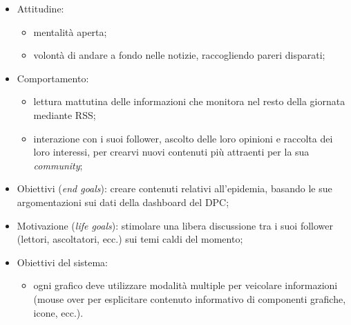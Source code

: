 \begin{itemize}
    \item Attitudine:
    \begin{itemize}
        \item mentalità aperta;
        \item volontà di andare a fondo nelle notizie, raccogliendo pareri disparati;
    \end{itemize}
    \item Comportamento: 
    \begin{itemize}
        \item lettura mattutina delle informazioni che monitora nel resto della giornata mediante RSS;
        \item interazione con i suoi follower, ascolto delle loro opinioni e raccolta dei loro interessi, per crearvi nuovi contenuti più attraenti per la sua \textit{community};
    \end{itemize}
    \item Obiettivi (\textit{end goals}): creare contenuti relativi all'epidemia, basando le sue argomentazioni sui dati della dashboard del DPC;
    \item Motivazione (\textit{life goals}): stimolare una libera discussione tra i suoi follower (lettori, ascoltatori, ecc.) sui temi caldi del momento;
    \item Obiettivi del sistema:
    \begin{itemize}
        \item ogni grafico deve utilizzare modalità multiple per veicolare informazioni (mouse over per esplicitare contenuto informativo di componenti grafiche, icone, ecc.). 
    \end{itemize}
\end{itemize}